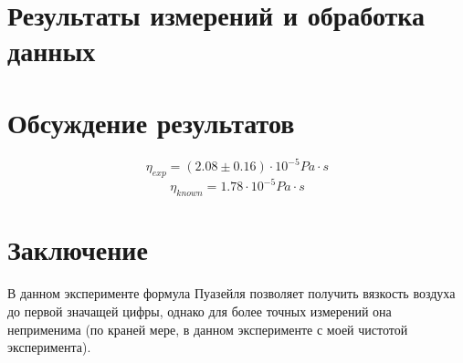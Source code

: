 \documentclass[1 pt]{article}
\begin{document}
\newpage
\section{Результаты измерений и обработка данных}
\begin{center}
    
\end{center}
\begin{center}
    
\end{center}
\begin{center}
    
\end{center}
\begin{center}
    
\end{center}
\begin{center}
    
\end{center}
\begin{center}
    
\end{center}
\section{Обсуждение результатов}
\begin{equation*}
    \eta_{exp} = (2.08 \pm 0.16) \cdot 10^{-5} Pa \cdot s
\end{equation*}
\begin{equation*}
    \eta_{known} = 1.78 \cdot 10^{-5} Pa \cdot s
\end{equation*}
\section{Заключение}
В данном эксперименте формула Пуазейля позволяет получить вязкость воздуха до первой значащей цифры, однако для более точных измерений она неприменима (по краней мере, в данном эксперименте с моей чистотой эксперимента).
\end{document}
